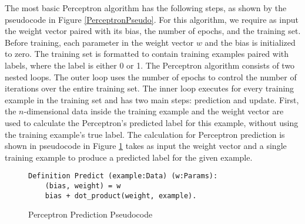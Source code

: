 The most basic Perceptron algorithm has the following steps, as shown by the pseudocode in Figure \ref{PerceptronPseudo}. For this algorithm, we require as input the weight vector paired with its bias, the number of epochs, and the training set. Before training, each parameter in the weight vector $w$ and the bias is initialized to zero. The training set is formatted to contain training examples paired with labels, where the label is either 0 or 1. The Perceptron algorithm consists of two nested loops. The outer loop uses the number of epochs to control the number of iterations over the entire training set. The inner loop executes for every training example in the training set and has two main steps: prediction and update. First, the $n$-dimensional data inside the training example and the weight vector are used to calculate the Perceptron's predicted label for this example, without using the training example's true label. The calculation for Perceptron prediction is shown in pseudocode in Figure \ref{PerceptronPredictPseudo} takes as input the weight vector and a single training example to produce a predicted label for the given example.

\begin{figure}
    \caption{Perceptron Prediction Pseudocode}
    \label{PerceptronPredictPseudo}
    \begin{lstlisting}
Definition Predict (example:Data) (w:Params):
    (bias, weight) = w 
    bias + dot_product(weight, example).
    \end{lstlisting}
\end{figure}

